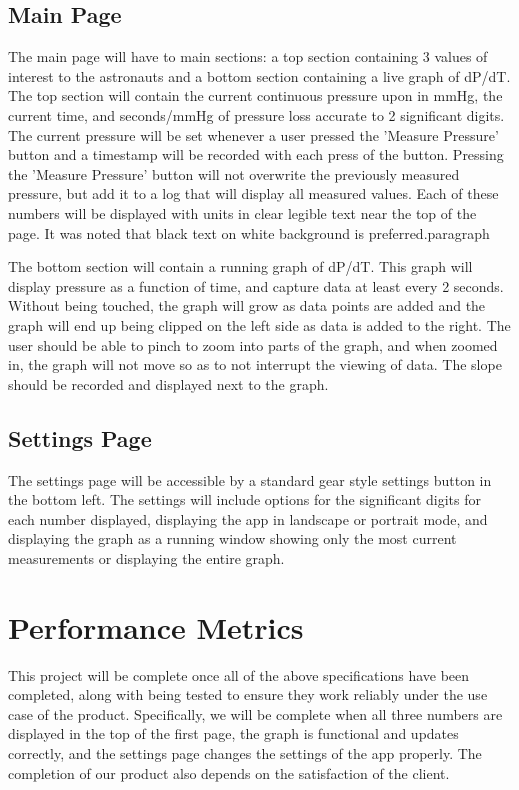 \documentclass[onecolumn, draftclsnofoot,10pt, compsoc]{IEEEtran}
\begin{document}
  \subsection{Main Page}
    The main page will have to main sections: a top section containing 3 values of interest to the astronauts and a bottom section containing a live graph of dP/dT.
    The top section will contain the current continuous pressure upon in mmHg, the current time, and seconds/mmHg of pressure loss accurate to 2 significant digits.
    The current pressure will be set whenever a user pressed the 'Measure Pressure' button and a timestamp will be recorded with each press of the button.
    Pressing the 'Measure Pressure' button will not overwrite the previously measured pressure, but add it to a log that will display all measured values.
    Each of these numbers will be displayed with units in clear legible text near the top of the page.
    It was noted that black text on white background is preferred.paragraph\par

    The bottom section will contain a running graph of dP/dT.
    This graph will display pressure as a function of time, and capture data at least every 2 seconds.
    Without being touched, the graph will grow as data points are added and the graph will end up being clipped on the left side as data is added to the right.
    The user should be able to pinch to zoom into parts of the graph, and when zoomed in, the graph will not move so as to not interrupt the viewing of data.
    The slope should be recorded and displayed next to the graph.

  \subsection{Settings Page}
  The settings page will be accessible by a standard gear style settings button in the bottom left.
  The settings will include options for the significant digits for each number displayed, displaying the app in landscape or portrait mode, and displaying the graph as a running window showing only the most current measurements or displaying the entire graph.


\section{Performance Metrics}
This project will be complete once all of the above specifications have been completed, along with being tested to ensure they work reliably under the use case of the product.
Specifically, we will be complete when all three numbers are displayed in the top of the first page, the graph is functional and updates correctly, and the settings page changes the settings of the app properly.
The completion of our product also depends on the satisfaction of the client.
\end{document}
